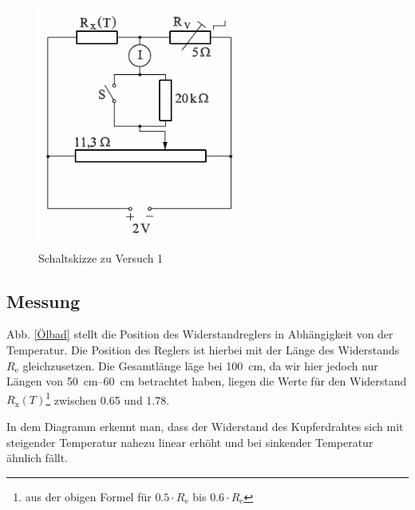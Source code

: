\documentclass[11pt,a4paper,titlepage, ngerman]{article}
\begin{document}
			\begin{figure}
				\centering
				\includegraphics[width=0.6\textwidth]{Versuch2.png}
				\caption{Schaltskizze zu Versuch 1}
				\label{Schaltskizze2}
			\end{figure}
		
		\subsection{Messung}
			
			Abb. \ref{Ölbad} stellt die Position des Widerstandreglers in Abhängigkeit von der Temperatur. Die Position des Reglers ist hierbei mit der Länge des Widerstands  $R_\text{e}$ gleichzusetzen. Die Gesamtlänge läge bei \SI{100}{cm}, da wir hier jedoch nur Längen von \SIrange{50}{60}{cm} betrachtet haben, liegen die Werte für den Widerstand $R_\text{x}(T)$\footnote{aus der obigen Formel für $0.5\cdot R_\text{e}$ bis $0.6\cdot R_\text{e}$} zwischen \SI{0,65}{\Omega} und \SI{1,78}{\Omega}.
			
			In dem Diagramm erkennt man, dass der Widerstand des Kupferdrahtes sich mit steigender Temperatur nahezu linear erhöht und bei sinkender Temperatur ähnlich fällt.
			
\end{document}
